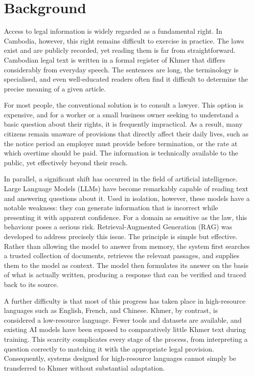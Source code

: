 \section{Background}

\hs Access to legal information is widely regarded as a fundamental right. In Cambodia,
however, this right remains difficult to exercise in practice. The laws exist and are
publicly recorded, yet reading them is far from straightforward. Cambodian legal text is
written in a formal register of Khmer that differs considerably from everyday speech.
The sentences are long, the terminology is specialised, and even well-educated readers
often find it difficult to determine the precise meaning of a given article.

\hs For most people, the conventional solution is to consult a lawyer. This option is
expensive, and for a worker or a small business owner seeking to understand a basic
question about their rights, it is frequently impractical. As a result, many citizens
remain unaware of provisions that directly affect their daily lives, such as the notice
period an employer must provide before termination, or the rate at which overtime should
be paid. The information is technically available to the public, yet effectively beyond
their reach.

\hs In parallel, a significant shift has occurred in the field of artificial
intelligence. Large Language Models (LLMs) have become remarkably capable of reading
text and answering questions about it. Used in isolation, however, these models have a
notable weakness: they can generate information that is incorrect while presenting it
with apparent confidence. For a domain as sensitive as the law, this behaviour poses a
serious risk. Retrieval-Augmented Generation (RAG) was developed to address precisely
this issue. The principle is simple but effective. Rather than allowing the model to
answer from memory, the system first searches a trusted collection of documents,
retrieves the relevant passages, and supplies them to the model as context. The model
then formulates its answer on the basis of what is actually written, producing a
response that can be verified and traced back to its source.

\hs A further difficulty is that most of this progress has taken place in
high-resource languages such as English, French, and Chinese. Khmer, by contrast, is
considered a low-resource language. Fewer tools and datasets are available, and existing
AI models have been exposed to comparatively little Khmer text during training. This
scarcity complicates every stage of the process, from interpreting a question correctly
to matching it with the appropriate legal provision. Consequently, systems designed for
high-resource languages cannot simply be transferred to Khmer without substantial
adaptation.

